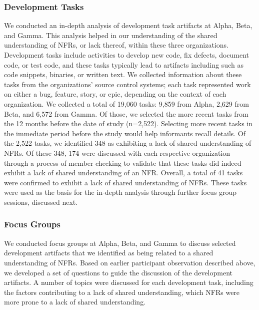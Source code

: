 \documentclass[smallextended]{svjour3}       %
\begin{document}
\subsubsection{Development Tasks}
\label{dev_tasks}
We conducted an in-depth analysis of development task artifacts at Alpha, Beta, and Gamma. This analysis helped in our understanding of the shared understanding of NFRs, or lack thereof, within these three organizations.
Development tasks include activities to develop new code, fix defects, document code, or test code, and these tasks typically lead to artifacts including such as code snippets, binaries, or written text. 
We collected information about these tasks from the organizations' source control systems; 
each task represented work on either a bug, feature, story, or epic, depending on the context of each organization.
We collected a total of 19,060 tasks: 9,859 from Alpha, 2,629 from Beta, and 6,572 from Gamma. Of those, we selected the more recent tasks from the 12 months before the date of study (n=2,522). Selecting more recent tasks in the immediate period before the study would help informants recall details. Of the 2,522 tasks, we identified 348 as exhibiting a lack of shared understanding of NFRs. 
Of these 348, 174 were discussed with each respective organization through a process of member checking to validate that these tasks did indeed exhibit a lack of shared understanding of an NFR. %
Overall, a total of 41 tasks were confirmed to exhibit a lack of shared understanding of NFRs.
These tasks were used as the basis for the in-depth analysis through further focus group sessions, discussed next. 

\subsubsection{Focus Groups}
We conducted focus groups at Alpha, Beta, and Gamma to discuss  
selected development artifacts that we identified as being related to a shared understanding of NFRs. 
Based on earlier participant observation described above, we developed a set of questions to guide the discussion of the development artifacts. 
A number of topics were discussed for each development task, including the factors contributing to a lack of shared understanding, which NFRs were more prone to a lack of shared understanding. 
\end{document}
